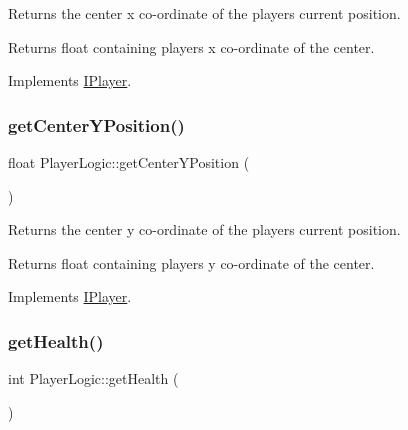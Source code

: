 Returns the center x co-\/ordinate of the player\textquotesingle{}s current position. 

\begin{DoxyReturn}{Returns}
float containing players x co-\/ordinate of the center. 
\end{DoxyReturn}


Implements \hyperlink{class_i_player_a10d652f5066f96f3526242448de3a6e2}{I\+Player}.

\mbox{\label{class_player_logic_ad7b9048aee0c7b58443055f37f871537}} 
\subsubsection{\texorpdfstring{get\+Center\+Y\+Position()}{getCenterYPosition()}}
{\footnotesize\ttfamily float Player\+Logic\+::get\+Center\+Y\+Position (\begin{DoxyParamCaption}{ }\end{DoxyParamCaption})\hspace{0.3cm}{\ttfamily [virtual]}}



Returns the center y co-\/ordinate of the player\textquotesingle{}s current position. 

\begin{DoxyReturn}{Returns}
float containing players y co-\/ordinate of the center. 
\end{DoxyReturn}


Implements \hyperlink{class_i_player_a6c5a2ec396245f91bee3e00ab089d57e}{I\+Player}.

\mbox{\label{class_player_logic_aa13b870627a1d38cd1c633ac8012e5af}} 
\subsubsection{\texorpdfstring{get\+Health()}{getHealth()}}
{\footnotesize\ttfamily int Player\+Logic\+::get\+Health (\begin{DoxyParamCaption}{ }\end{DoxyParamCaption})}



